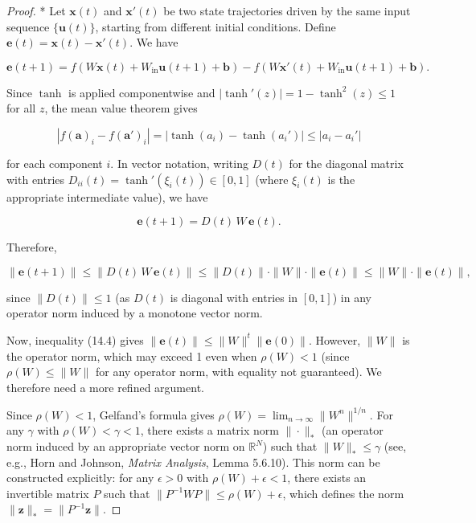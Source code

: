 \begin{proof}
* Let $\mathbf{x}(t)$ and $\mathbf{x}'(t)$ be two state trajectories driven by the same input sequence $\{\mathbf{u}(t)\}$, starting from different initial conditions. Define $\mathbf{e}(t) = \mathbf{x}(t) - \mathbf{x}'(t)$. We have

\[
\mathbf{e}(t+1) = f\!\left(W\mathbf{x}(t) + W_{\text{in}}\mathbf{u}(t+1) + \mathbf{b}\right) - f\!\left(W\mathbf{x}'(t) + W_{\text{in}}\mathbf{u}(t+1) + \mathbf{b}\right).
\]

Since $\tanh$ is applied componentwise and $|\tanh'(z)| = 1 - \tanh^2(z) \leq 1$ for all $z$, the mean value theorem gives

\[
|f(\mathbf{a})_i - f(\mathbf{a}')_i| = |\tanh(a_i) - \tanh(a_i')| \leq |a_i - a_i'|
\]

for each component $i$. In vector notation, writing $D(t)$ for the diagonal matrix with entries $D_{ii}(t) = \tanh'(\xi_i(t)) \in [0, 1]$ (where $\xi_i(t)$ is the appropriate intermediate value), we have

\[
\mathbf{e}(t+1) = D(t)\, W\, \mathbf{e}(t).
\]

Therefore,

\begin{equation}\label{eq:14.4}\tag{14.4}
\|\mathbf{e}(t+1)\| \leq \|D(t)\, W\, \mathbf{e}(t)\| \leq \|D(t)\| \cdot \|W\| \cdot \|\mathbf{e}(t)\| \leq \|W\| \cdot \|\mathbf{e}(t)\|,
\end{equation}

since $\|D(t)\| \leq 1$ (as $D(t)$ is diagonal with entries in $[0,1]$) in any operator norm induced by a monotone vector norm.

Now, inequality (14.4) gives $\|\mathbf{e}(t)\| \leq \|W\|^t \|\mathbf{e}(0)\|$. However, $\|W\|$ is the operator norm, which may exceed 1 even when $\rho(W) < 1$ (since $\rho(W) \leq \|W\|$ for any operator norm, with equality not guaranteed). We therefore need a more refined argument.

Since $\rho(W) < 1$, Gelfand's formula gives $\rho(W) = \lim_{n \to \infty} \|W^n\|^{1/n}$. For any $\gamma$ with $\rho(W) < \gamma < 1$, there exists a matrix norm $\|\cdot\|_*$ (an operator norm induced by an appropriate vector norm on $\mathbb{R}^N$) such that $\|W\|_* \leq \gamma$ (see, e.g., Horn and Johnson, \textit{Matrix Analysis}, Lemma 5.6.10). This norm can be constructed explicitly: for any $\epsilon > 0$ with $\rho(W) + \epsilon < 1$, there exists an invertible matrix $P$ such that $\|P^{-1}WP\| \leq \rho(W) + \epsilon$, which defines the norm $\|\mathbf{z}\|_* = \|P^{-1}\mathbf{z}\|$.


\end{proof}
